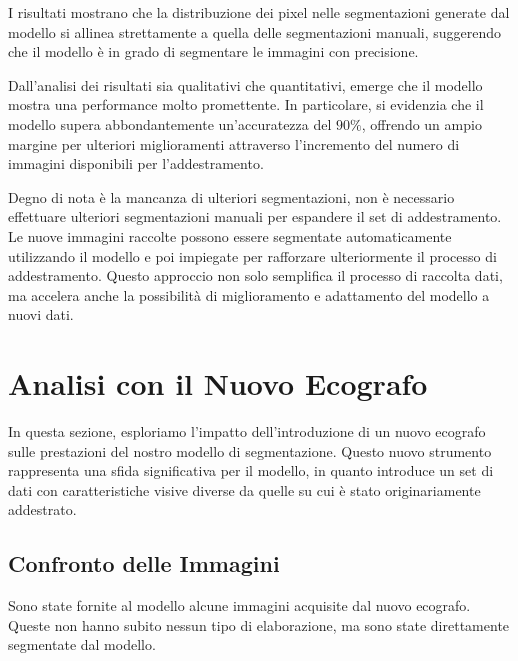 I risultati mostrano che la distribuzione dei pixel nelle segmentazioni generate dal modello si
allinea strettamente a quella delle segmentazioni manuali, suggerendo che il modello è in grado di
segmentare le immagini con precisione.


Dall'analisi dei risultati sia qualitativi che quantitativi, emerge che il modello mostra una
performance molto promettente. In particolare, si evidenzia che il modello supera abbondantemente
un'accuratezza del $90\%$, offrendo un ampio margine per ulteriori miglioramenti attraverso
l'incremento del numero di immagini disponibili per l'addestramento.

Degno di nota è la mancanza di ulteriori segmentazioni, non è necessario effettuare ulteriori
segmentazioni manuali per espandere il set di addestramento. Le nuove immagini raccolte possono
essere segmentate automaticamente utilizzando il modello e poi impiegate per rafforzare
ulteriormente il processo di addestramento. Questo approccio non solo semplifica il processo di
raccolta dati, ma accelera anche la possibilità di miglioramento e adattamento del modello a nuovi
dati.


\section{Analisi con il Nuovo Ecografo}
\label{sec:analisi_nuovo_ecografo}

In questa sezione, esploriamo l'impatto dell'introduzione di un nuovo ecografo sulle prestazioni del
nostro modello di segmentazione. Questo nuovo strumento rappresenta una sfida significativa per il
modello, in quanto introduce un set di dati con caratteristiche visive diverse da quelle su cui è
stato originariamente addestrato.

\subsection{Confronto delle Immagini}
\label{subsec:confronto_immagini}

Sono state fornite al modello alcune immagini acquisite dal nuovo ecografo. Queste non hanno subito
nessun tipo di elaborazione, ma sono state direttamente segmentate dal modello.


